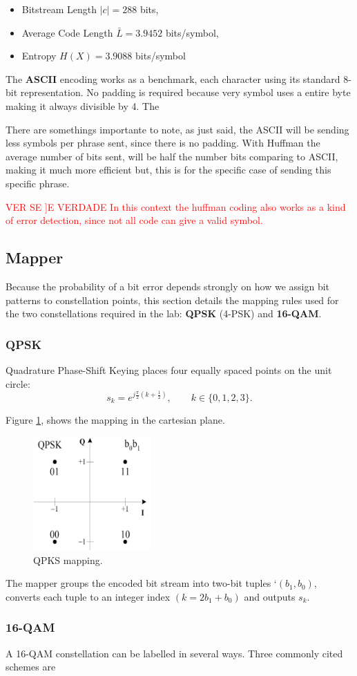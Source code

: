 \begin{itemize}
  \item Bitstream Length $\lvert c\rvert = 288$ bits,
  \item Average Code Length $\bar L = 3.9452$ bits/symbol,
  \item Entropy $H(X)=3.9088$ bits/symbol
\end{itemize}



The \textbf{ASCII} encoding works as a benchmark, each character using its standard 8-bit representation. No padding is required because very symbol uses a entire byte making it always divisible by 4. The 

There are somethings importante to note, as just said, the ASCII will be sending less symbols per phrase sent, since there is no padding. With Huffman the average number of bits sent, will be half the number bits comparing to ASCII, making it much more efficient but, this is for the specific case of sending this specific phrase. 

\textcolor{red}{VER SE ]E VERDADE  In this context the huffman coding also works as a kind of error detection, since not all code can give a valid symbol.}

\subsection{Mapper}
  
Because the probability of a bit error depends strongly on how we assign bit patterns to constellation points, this section details the mapping rules used for the two constellations required in the lab: \textbf{QPSK} (4-PSK) and \textbf{16-QAM}.


\subsubsection{QPSK}%
Quadrature Phase-Shift Keying places four equally spaced points on the unit circle:
\[
s_k = e^{j\frac{\pi}{2}\left(k+\tfrac12\right)}, \qquad k\in\{0,1,2,3\}.
\]

Figure \ref{fig:QPKS_Mapping}, shows the mapping in the cartesian plane.

\begin{figure}[H]
  \centering
  \includegraphics[width=0.4\textwidth]{Images/QPKS_Mapping.png}
  \caption{QPKS mapping.\cite{Sadough2012_UWB_OFDM}}
  \label{fig:QPKS_Mapping}
\end{figure}

The mapper groups the encoded bit stream into two-bit tuples `$(b_1,b_0)$, converts each tuple to an integer index $(k =2b_1+b_0)$ and outputs \(s_k\).


\subsubsection{16-QAM}
A 16-QAM constellation can be labelled in several ways. Three commonly cited schemes are
